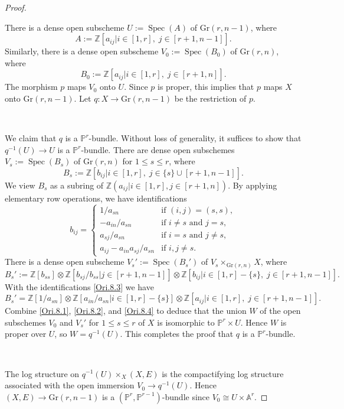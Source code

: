 \documentclass[11pt, a4paper]{amsart}
\theoremstyle{definition}
\numberwithin{equation}{subsection}
\newcommand{\Z}{\mathbb{Z}}
\renewcommand{\P}{\mathbb{P}}
\newcommand{\A}{\mathbb{A}}
\providecommand{\Spec}[1]{\operatorname{Spec}(#1)} 	%
\newcommand{\Gr}{{\mathrm{Gr}}}
\begin{document}
\begin{proof}
\

There is a dense open subscheme $U:=\Spec{A}$ of $\Gr(r,n-1)$, 
where
\begin{equation}
\label{Ori.8.1}
A:=\Z[a_{ij} \vert i\in [1,r],\;j\in [r+1,n-1]].
\end{equation}
Similarly, 
there is a dense open subscheme $V_0:=\Spec{B_0}$ of $\Gr(r,n)$, where
\begin{equation}
\label{Ori.8.2}
B_0:=\Z[a_{ij}\vert i\in [1,r],\; j\in [r+1,n]].
\end{equation}
The morphism $p$ maps $V_0$ onto $U$.
Since $p$ is proper, this implies that $p$ maps $X$ onto $\Gr(r,n-1)$.
Let $q\colon X\to \Gr(r,n-1)$ be the restriction of $p$.

\ 

We claim that $q$ is a $\P^r$-bundle.
Without loss of generality, it suffices to show that $q^{-1}(U)\to U$ is a $\P^r$-bundle.
There are dense open subschemes $V_s:=\Spec{B_s}$ of $\Gr(r,n)$ for $1\leq s\leq r$, where
\[
B_s:=\Z[b_{ij} \vert i\in [1,r],\; j\in \{s\}\cup [r+1,n-1]].
\]
We view $B_s$ as a subring of $\Z(a_{ij}\vert i\in [1,r],j\in [r+1,n])$.
By applying elementary row operations, we have identifications
\begin{equation}
\label{Ori.8.3}
b_{ij}
=
\left\{
\begin{array}{ll}
1/a_{sn} & \text{if }(i,j)=(s,s),
\\
-a_{in}/a_{sn} &\text{if }i\neq s\text{ and }j=s,
\\
a_{sj}/a_{sn} &\text{if }i=s\text{ and }j\neq s,
\\
a_{ij}-a_{in}a_{sj}/a_{sn} & \text{if }i,j\neq s.
\end{array}
\right.
\end{equation}
There is a dense open subscheme $V_s':=\Spec{B_s'}$ of $V_s\times_{\Gr(r,n)}X$, where
\[
B_s':=\Z[b_{ss}]\otimes \Z[b_{sj}/b_{ss}\vert j\in [r+1,n-1]] \otimes \Z[b_{ij}\vert i\in [1,r]-\{s\},\;j\in [r+1,n-1]].
\]
With the identifications \eqref{Ori.8.3} we have
\begin{equation}
\label{Ori.8.4}
B_s'=\Z[1/a_{sn}]\otimes \Z[a_{in}/a_{sn}\vert i\in [1,r]-\{s\}]\otimes \Z[a_{ij}\vert i\in [1,r],\; j\in [r+1,n-1]].
\end{equation}
Combine \eqref{Ori.8.1}, \eqref{Ori.8.2}, and \eqref{Ori.8.4} to deduce that the union $W$ of the open subschemes $V_0$ and $V_s'$ for $1\leq s\leq r$ of $X$ is isomorphic to $\P^r\times U$.
Hence $W$ is proper over $U$, so $W=q^{-1}(U)$.
This completes the proof that $q$ is a $\P^r$-bundle.

\ 

The log structure on $q^{-1}(U)\times_X (X,E)$ is the compactifying log structure associated 
with the open immersion $V_0\to q^{-1}(U)$.
Hence $(X,E)\to \Gr(r,n-1)$ is a $(\P^r,\P^{r-1})$-bundle since $V_0\cong U\times \A^r$.
\end{proof}
\end{document}
